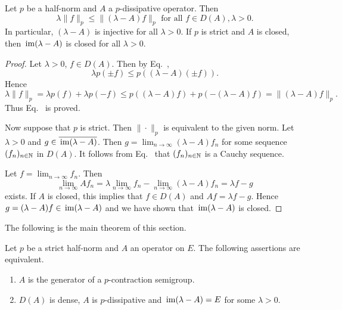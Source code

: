 \begin{lemma}\label{lem:a2-2.10}
Let $p$ be a half-norm and $A$ a $p$-dissipative operator.
Then
\begin{equation}\label{eq:a2-2.14}
\lambda\|f\|_{p} \leq \|(\lambda - A)f\|_{p} \text{ for all } f \in D(A), \lambda > 0.
\end{equation}
In particular, $(\lambda-A)$ is injective for all $\lambda > 0$.
If\/ $p$ is strict and $A$ is closed, then $\mathop{}\mathrm{im}(\lambda - A)$ is closed for all $\lambda > 0$.
\end{lemma}
\begin{proof}
Let $\lambda > 0$, $f \in D(A)$.
Then by Eq.~, 
%
\[
	\lambda p(\pm f) \leq p((\lambda - A)(\pm f)) .
\]
%
Hence 
\[
\lambda \|f\|_{p} = \lambda p(f) + \lambda p(-f) \leq p((\lambda - A)f) + p(-(\lambda-A)f) = \|(\lambda-A)f\|_{p}.
\]
Thus Eq.~ is proved.

Now suppose that $p$ is strict.
Then $\|\cdot\|_{p}$ is equivalent to the given norm.
Let $\lambda > 0$ and $g \in \overline{\mathop{}\mathrm{im}(\lambda - A)}$.
Then $g = \lim_{n\to\infty} (\lambda - A)f_{n}$ for some sequence $(f_{n})_{n \in \mathbb{N}} $ in $D(A)$.
It follows from Eq.~ that $(f_{n})_{n\in\mathbb{N}}$ is a Cauchy sequence.

Let $f = \lim_{n\to\infty} f_{n}$.
Then 
\[
\lim_{n\to\infty} Af_{n} 
= \lambda\lim_{n\to\infty} f_{n} - \lim_{n\to\infty} (\lambda - A)f_{n} = \lambda f - g
\]
exists.
If\/ $A$ is closed, this implies that $f \in D(A)$ and $Af = \lambda f - g$.
Hence $g = (\lambda - A)f \in \mathop{}\mathrm{im}(\lambda - A)$ and we have shown that $\mathop{}\mathrm{im}(\lambda - A)$ is closed.
\end{proof}
The following is the main theorem of this section.
\begin{theorem}\label{thm:a2-2.11}
Let $p$ be a strict half-norm and $A$ an operator on $E$.
The following assertions are equivalent.
\begin{enumerate}[\upshape (a)]
\item \label{thm:a2-2.11.1}
$A$ is the generator of a $p$-contraction semigroup.
\item \label{thm:a2-2.11.2}
$D(A)$ is dense, $A$ is $p$-dissipative and $\mathop{}\mathrm{im}(\lambda - A) = E$ for some $\lambda > 0$.
\end{enumerate}
\end{theorem}
